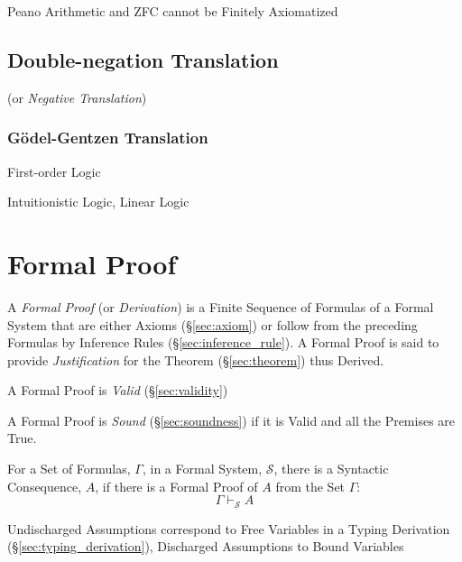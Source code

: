 Peano Arithmetic and ZFC cannot be Finitely Axiomatized



\subsection{Double-negation Translation}
\label{sec:double_negation_translation}

(or \emph{Negative Translation})



\subsubsection{G\"odel-Gentzen Translation}\label{sec:godel_gentzen}

First-order Logic

Intuitionistic Logic, Linear Logic



\section{Formal Proof} \label{sec:formal_proof}

A \emph{Formal Proof} (or \emph{Derivation}) is a Finite Sequence of
Formulas of a Formal System that are either Axioms (\S\ref{sec:axiom})
or follow from the preceding Formulas by Inference Rules
(\S\ref{sec:inference_rule}). A Formal Proof is said to provide
\emph{Justification} for the Theorem (\S\ref{sec:theorem}) thus
Derived.

A Formal Proof is \emph{Valid} (\S\ref{sec:validity})

A Formal Proof is \emph{Sound} (\S\ref{sec:soundness}) if it is Valid
and all the Premises are True.

For a Set of Formulas, $\Gamma$, in a Formal System, $\mathcal{S}$,
there is a Syntactic Consequence, $A$, if there is a Formal Proof of
$A$ from the Set $\Gamma$:
\[
  \Gamma \vdash_{\mathcal{S}} A
\]

Undischarged Assumptions correspond to Free Variables in a Typing
Derivation (\S\ref{sec:typing_derivation}), Discharged Assumptions to
Bound Variables


